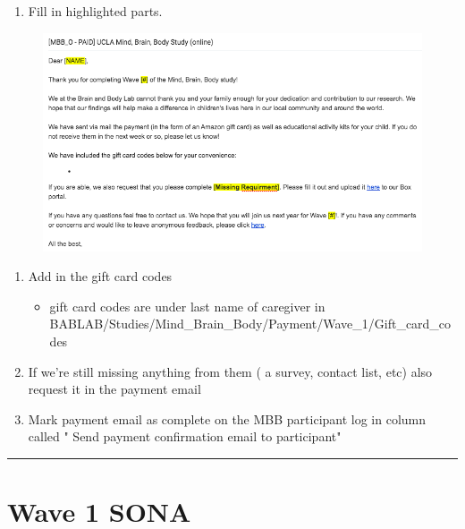 \documentclass[]{book}
\providecommand{\tightlist}{%
  \setlength{\itemsep}{0pt}\setlength{\parskip}{0pt}}
\begin{document}
\begin{enumerate}
\def\labelenumi{\arabic{enumi}.}
\setcounter{enumi}{1}
\tightlist
\item
  Fill in highlighted parts.
\end{enumerate}

\begin{figure}
\centering
\includegraphics{images/payment/b.png}
\caption{}
\end{figure}

\begin{enumerate}
\def\labelenumi{\arabic{enumi}.}
\setcounter{enumi}{2}
\item
  Add in the gift card codes

  \begin{itemize}
  \tightlist
  \item
    gift card codes are under last name of caregiver in BABLAB/Studies/Mind\_Brain\_Body/Payment/Wave\_1/Gift\_card\_codes
  \end{itemize}
\item
  If we're still missing anything from them ( a survey, contact list, etc) also request it in the payment email
\item
  Mark payment email as complete on the MBB participant log in column called " Send payment confirmation email to participant"
\end{enumerate}

\begin{center}\rule{0.5\linewidth}{0.5pt}\end{center}

\hypertarget{wave-1-sona}{%
\chapter{Wave 1 SONA}\label{wave-1-sona}}
\end{document}
